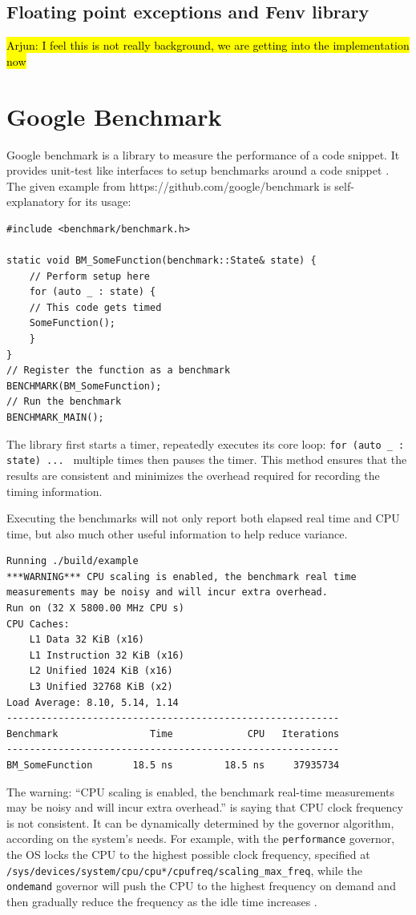 \documentclass[logo,bsc,singlespacing,parskip]{infthesis}
\begin{document}
\subsection{Floating point exceptions and Fenv library}
\label{sec:fpe}
\hl{Arjun: I feel this is not really background, we are getting into the implementation now}

\section{Google Benchmark}
Google benchmark is a library to measure the performance of a code snippet. It
provides unit-test like interfaces to setup benchmarks around a code snippet
\cite{googlebench}. The given example from https://github.com/google/benchmark
is self-explanatory for its usage: 

\begin{verbatim}
#include <benchmark/benchmark.h>

static void BM_SomeFunction(benchmark::State& state) {
    // Perform setup here
    for (auto _ : state) {
    // This code gets timed
    SomeFunction();
    }
}
// Register the function as a benchmark
BENCHMARK(BM_SomeFunction);
// Run the benchmark
BENCHMARK_MAIN();
\end{verbatim}

The library first starts a timer, repeatedly executes its core loop: \texttt{for
(auto \_ : state) ... } multiple times then pauses the timer. This method
ensures that the results are consistent and minimizes the overhead required for
recording the timing information. 

Executing the benchmarks will not only report both elapsed real time and CPU
time, but also much other useful information to help reduce variance. 
\begin{verbatim}
Running ./build/example
***WARNING*** CPU scaling is enabled, the benchmark real time 
measurements may be noisy and will incur extra overhead.
Run on (32 X 5800.00 MHz CPU s)
CPU Caches:
    L1 Data 32 KiB (x16)
    L1 Instruction 32 KiB (x16)
    L2 Unified 1024 KiB (x16)
    L3 Unified 32768 KiB (x2)
Load Average: 8.10, 5.14, 1.14
----------------------------------------------------------
Benchmark                Time             CPU   Iterations
----------------------------------------------------------
BM_SomeFunction       18.5 ns         18.5 ns     37935734
\end{verbatim}

The warning: ``CPU scaling is enabled, the benchmark real-time measurements may
be noisy and will incur extra overhead.'' is saying that CPU clock frequency is
not consistent. It can be dynamically determined by the governor algorithm,
according on the system's needs. For example, with the \texttt{performance}
governor, the OS locks the CPU to the highest possible clock frequency,
specified at \texttt{/sys/devices/system/cpu/cpu*/cpufreq/scaling\_max\_freq},
while the \texttt{ondemand} governor will push the CPU to the highest frequency
on demand and then gradually reduce the frequency as the idle time increases
\cite{archLinuxFreqScal}.
\end{document}

